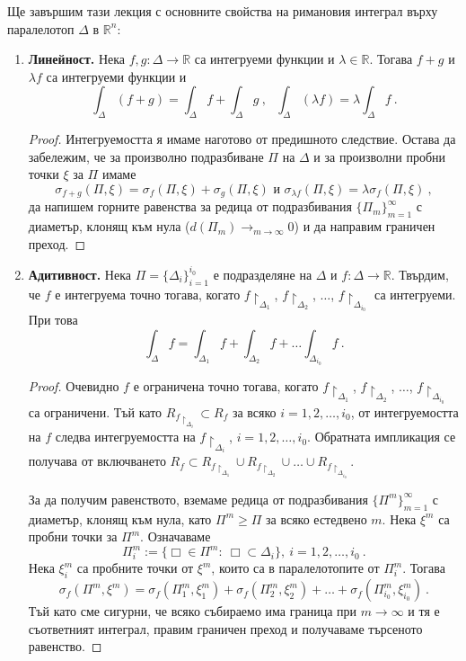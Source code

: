 \documentclass[11pt]{article}
\numberwithin{equation}{section}
\numberwithin{figure}{section}
\numberwithin{table}{section}
\theoremstyle{plain}
\theoremstyle{definition}
\theoremstyle{remark}
\theoremstyle{definition}
\theoremstyle{remark}
\theoremstyle{plain}
\theoremstyle{definition}
\theoremstyle{definition}
\theoremstyle{plain}
\theoremstyle{plain}
\theoremstyle{plain}
\theoremstyle{definition}
\theoremstyle{plain}
\newcommand*{\R}{\mathbb{R}}
\begin{document}
Ще завършим тази лекция с основните свойства на римановия интеграл върху паралелотоп $\Delta$ в $\R^n$:
\medskip

\begin{enumerate}
\item \textbf{Линейност.} Нека $f, g: \Delta \longrightarrow\R$ са интегруеми функции и $\lambda\in \R$. Тогава 
$f+g$ и $\lambda f$ са интегруеми функции и 
$$\int_\Delta (f+g) = \int_\Delta f + \int_\Delta g  \ , \ \ \ \int_\Delta (\lambda f)=\lambda\int_\Delta f \ .$$

\begin{proof}
Интегруемостта я имаме наготово от предишното следствие. Остава да забележим, че за произволно подразбиване $\Pi$ на $\Delta$ и за произволни пробни точки $\xi$ за $\Pi$ имаме
$$\sigma_{f+g} (\Pi ,\xi )=\sigma_{f} (\Pi ,\xi )+\sigma_{g} (\Pi ,\xi ) \mbox{ и } \sigma_{\lambda f} (\Pi ,\xi )= \lambda\sigma_{f} (\Pi ,\xi ) \ ,$$
да напишем горните равенства за редица от подразбивания $\{ \Pi_m\}_{m=1}^\infty$ с диаметър, клонящ към нула ($d(\Pi_m)\longrightarrow_{m\to \infty}0$) и да направим граничен преход.
\end{proof}

\item \textbf{Адитивност.} Нека $\Pi = \{ \Delta_i\}_{i=1}^{i_0}$ е подразделяне на $\Delta$ и $f:\Delta\longrightarrow\R$. Твърдим, че $f$ е интегруема точно тогава, когато $f\restriction_{\Delta_1}$, $f\restriction_{\Delta_2}$, $\dots$, $f\restriction_{\Delta_{i_0}}$ са интегруеми. При това
$$\int_\Delta f = \int_{\Delta_1} f + \int_{\Delta_2} f + \dots \int_{\Delta_{i_0}} f \ .$$

\begin{proof}
Очевидно $f$ е ограничена точно тогава, когато $f\restriction_{\Delta_1}$, $f\restriction_{\Delta_2}$, $\dots$, $f\restriction_{\Delta_{i_0}}$ са ограничени. Тъй като $R_{f\restriction_{\Delta_i}}\subset R_f$ за всяко $i=1,2,\dots ,i_0$, от интегруемостта на $f$ следва интегруемостта на $f\restriction_{\Delta_i}$, $i=1,2,\dots ,i_0$. Обратната импликация се получава от включването $R_f \subset R_{f\restriction_{\Delta_1}}\cup R_{f\restriction_{\Delta_2}}\cup \dots \cup R_{f\restriction_{\Delta_{i_0}}}$.

За да получим равенството, вземаме редица от подразбивания $\{ \Pi^m\}_{m=1}^\infty$ с диаметър, клонящ към нула, като $\Pi^m \ge \Pi$ за всяко естедвено $m$. Нека $\xi^m$ са пробни точки за $\Pi^m$. Означаваме
$$\Pi^m_i:=\{ \Box \in \Pi^m: \ \Box\subset \Delta_i\}, \ i=1,2,\dots ,i_0 \ .$$
Нека $\xi^m_i$ са пробните точки от $\xi^m$, които са в паралелотопите от $\Pi^m_i$. Тогава
$$\sigma_f(\Pi^m,\xi^m)=\sigma_f(\Pi^m_1,\xi^m_1)+\sigma_f(\Pi^m_2,\xi^m_2)+\dots +\sigma_f(\Pi^m_{i_0},\xi^m_{i_0}) \ .$$
Тъй като сме сигурни, че всяко събираемо има граница при $m\rightarrow \infty$ и тя е съответният интеграл, правим граничен преход и получаваме търсеното равенство.
\end{proof}


\end{enumerate}
\end{document}
